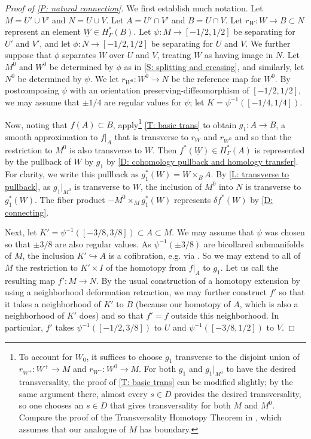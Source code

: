 \documentclass[12pt]{article}
\newcommand{\uW}{\underline{W}}
\theoremstyle{plain}
\theoremstyle{definition}
\theoremstyle{remark}
\newcommand{\into}{\hookrightarrow}
\begin{document}
\begin{proof}[Proof of \cref{P: natural connection}]
	We first establish much notation.
	Let $M = U' \cup V'$ and $N = U \cup V$.
	Let $A = U' \cap V'$ and $B = U \cap V$.
	Let $r_W \colon W \to B \subset N$ represent an element $\uW \in H^*_\Gamma(B)$.
	Let $\psi \colon M \to [-1/2, 1/2]$ be separating for $U'$ and $V'$, and let $\phi \colon N \to [-1/2, 1/2]$ be separating for $U$ and $V$.
	We further suppose that $\phi$ separates $W$ over $U$ and $V$, treating $W$ as having image in $N$.
	Let $M^0$ and $W^0$ be determined by $\phi$ as in \cref{S: splitting and creasing}, and similarly, let $N^0$ be determined by $\psi$.
	We let $r_{W^0} \colon W^0 \to N$ be the reference map for $W^0$.
	By postcomposing $\psi$ with an orientation preserving-diffeomorphism of $[-1/2, 1/2]$, we may assume that $\pm 1/4$ are regular values for $\psi$; let $K = \psi^{-1}([-1/4, 1/4])$.

	Now, noting that $f(A) \subset B$, apply\footnote{To account for $W_0$, it suffices to choose $g_1$ transverse to the disjoint union of $r_{W^+} \colon W^+ \to M$ and $r_{W^-} \colon W^0 \to M$. For both $g_1$ and $g_1|_{M^0}$ to have the desired transversality, the proof of \cref{T: basic trans} can be modified slightly; by the same argument there, almost every $s \in D$ provides the desired transversality, so one chooses an $s \in D$ that gives transversality for both $M$ and $M^0$. Compare the proof of the Transversality Homotopy Theorem in \cite{GuPo74}, which assumes that our analogue of $M$ has boundary.} \cref{T: basic trans} to obtain $g_1 \colon A \to B$, a smooth approximation to $f|_A$ that is transverse to $r_W$ and $r_{W^0}$ and so that the restriction to $M^0$ is also transverse to $W$.
	Then $f^*(\uW) \in H^*_\Gamma(A)$ is represented by the pullback of $W$ by $g_1$ by \cref{D: cohomology pullback and homology transfer}.
	For clarity, we write this pullback as $g_1^*(W) = W \times_B A$.
	By \cref{L: transverse to pullback}, as $g_1|_{M^0}$ is transverse to $W$, the inclusion of $M^0$ into $N$ is transverse to $g_1^*(W)$.
	The fiber product $ - M^0 \times_M g_1^*(W)$ represents $\delta f^* (W)$ by \cref{D: connecting}.

	Next, let $K' = \psi^{-1}([-3/8, 3/8]) \subset A \subset M$.
	We may assume that $\psi$ was chosen so that $\pm 3/8$ are also regular values.
	As $\psi^{-1}(\pm 3/8)$ are bicollared submanifolds of $M$, the inclusion $K' \into A$ is a cofibration, e.g. via \cite[Theorem VII.1.5]{Bred97}.
	So we may extend to all of $M$ the restriction to $K' \times I$ of the homotopy from $f|_A$ to $g_1$.
	Let us call the resulting map $f' \colon M \to N$.
	By the usual construction of a homotopy extension by using a neighborhood deformation retraction, we may further construct $f'$ so that it takes a neighborhood of $K'$ to $B$ (because our homotopy of $A$, which is also a neighborhood of $K'$ does) and so that $f' = f$ outside this neighborhood.
	In particular, $f'$ takes $\psi^{-1}([-1/2,3/8])$ to $U$ and $\psi^{-1}([-3/8,1/2])$ to $V$.


\end{proof}
\end{document}
